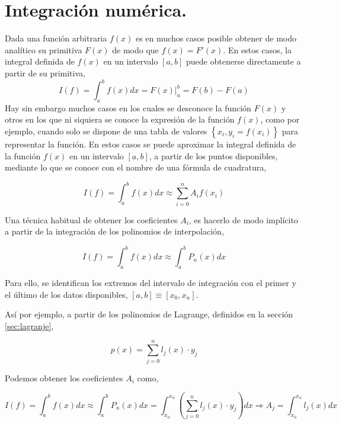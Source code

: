 \section{Integración numérica.}

Dada una función arbitraria $f(x)$ es en muchos casos posible obtener de modo analítico su primitiva $F(x)$ de modo que $f(x)=F'(x)$. En estos casos, la integral definida de $f(x)$ en un intervalo $[a,b]$ puede obtenerse directamente a partir de su primitiva,
\begin{equation*}
I(f)=\int_a^bf(x)dx=F(x)\vert_a^b=F(b)-F(a)
\end{equation*}
Hay sin embargo muchos casos en los cuales se desconoce la función $F(x)$ y otros en los que ni siquiera se conoce la expresión de la función $f(x)$, como por ejemplo, cuando solo se dispone de una tabla de valores $\left\lbrace x_i,y_i=f(x_i) \right\rbrace$ para representar la función. En estos casos se puede aproximar la integral definida de la función $f(x)$ en un intervalo $[a,b]$, a partir de los puntos disponibles, mediante lo que se conoce con el nombre de una fórmula de cuadratura,

\begin{equation*}
I(f)=\int_a^bf(x)dx \approx \sum_{i=0}^nA_if(x_i)
\end{equation*}

Una técnica habitual de obtener los coeficientes $A_i$, es hacerlo de modo implícito a partir de la integración  de los polinomios de interpolación,

 \begin{equation*}
I(f)=\int_a^bf(x)dx \approx \int_a^bP_n(x)dx
\end{equation*}

Para ello, se identifican los extremos del intervalo de integración con el primer y el último de los datos disponibles, $[a,b]\equiv [x_0,x_n]$.

Así por ejemplo, a partir de los polinomios de Lagrange, definidos en la sección \ref{sec:lagranje},

\begin{equation*}
p(x)=\sum_{j=0}^n l_j(x)\cdot y_j
\end{equation*}

Podemos obtener los coeficientes $A_i$ como,

\begin{equation*}
I(f)=\int_a^bf(x)dx \approx \int_a^bP_n(x)dx=\int_{x_0}^{x_n}\left( \sum_{j=0}^n l_j(x)\cdot y_j \right) dx \Rightarrow A_j=\int_{x_0}^{x_n}l_j(x)dx
\end{equation*}

